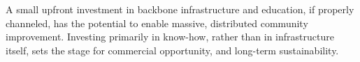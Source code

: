 A small upfront investment in backbone infrastructure and education, if properly
channeled, has the potential to enable massive, distributed community
improvement. Investing  primarily in know-how, rather than in infrastructure
itself, sets the stage for commercial opportunity, and long-term sustainability.

